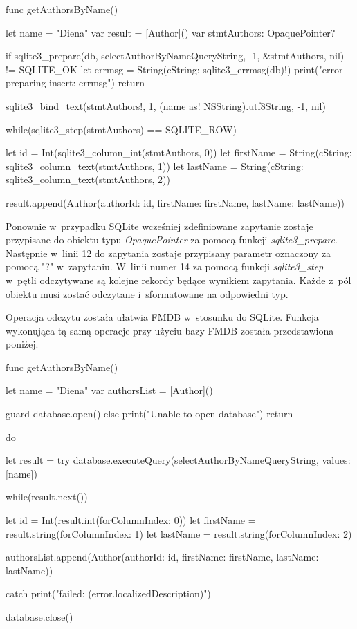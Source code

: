 \begin{code}[
		language=swift,
		caption={Przykład odczytu danych SQLite},
		label={lis:sqlite_read_code},
	]
    func getAuthorsByName() {
        let name = "Diena"
        var result = [Author]()
        var stmtAuthors: OpaquePointer?
        
        if sqlite3_prepare(db, selectAuthorByNameQueryString, -1, &stmtAuthors, nil) != SQLITE_OK {
            let errmsg = String(cString: sqlite3_errmsg(db)!)
            print("error preparing insert: errmsg")
            return
        }
        
        sqlite3_bind_text(stmtAuthors!, 1, (name as! NSString).utf8String, -1, nil)
        
        while(sqlite3_step(stmtAuthors) == SQLITE_ROW) {
            let id = Int(sqlite3_column_int(stmtAuthors, 0))
            let firstName = String(cString: sqlite3_column_text(stmtAuthors, 1))
            let lastName = String(cString: sqlite3_column_text(stmtAuthors, 2))
            
            result.append(Author(authorId: id, firstName: firstName, lastName: lastName))
        }
    }
\end{code}

Ponownie w~przypadku SQLite wcześniej zdefiniowane zapytanie zostaje przypisane do obiektu typu \textit{OpaquePointer} za pomocą funkcji \textit{sqlite3\_prepare}. Następnie w~linii 12 do zapytania zostaje przypisany parametr oznaczony za pomocą "?" w~zapytaniu. W~linii numer 14 za pomocą funkcji \textit{sqlite3\_step} w~pętli odczytywane są kolejne rekordy będące wynikiem zapytania. Każde z~pól obiektu musi zostać odczytane i~sformatowane na odpowiedni typ. 

Operacja odczytu została ułatwia FMDB w~stosunku do SQLite. Funkcja wykonująca tą samą operacje przy użyciu bazy FMDB została przedstawiona poniżej. 

\begin{code}[
		language=swift,
		caption={Przykład odczytu danych FMDB},
		label={lis:fmdb_read_code},
	]
func getAuthorsByName() {
        let name = "Diena"
        var authorsList = [Author]()
        
        guard database.open() else {
            print("Unable to open database")
            return
        }
        
        do {
            let result = try database.executeQuery(selectAuthorByNameQueryString, values: [name])
            
            while(result.next()) {
                let id = Int(result.int(forColumnIndex: 0))
                let firstName = result.string(forColumnIndex: 1)
                let lastName = result.string(forColumnIndex: 2)
                
                authorsList.append(Author(authorId: id, firstName: firstName, lastName: lastName))
            }
        } catch {
            print("failed: (error.localizedDescription)")
        }
        
        database.close()
    }
\end{code}

